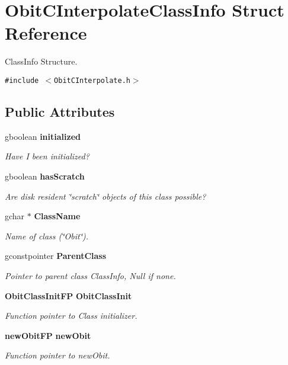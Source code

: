 \section{Obit\-CInterpolate\-Class\-Info Struct Reference}
\label{structObitCInterpolateClassInfo}
Class\-Info Structure.  


{\tt \#include $<$Obit\-CInterpolate.h$>$}

\subsection*{Public Attributes}
\begin{CompactItemize}
\item 
gboolean {\bf initialized}
\begin{CompactList}\small\item\em Have I been initialized? \item\end{CompactList}\item 
gboolean {\bf has\-Scratch}
\begin{CompactList}\small\item\em Are disk resident \char`\"{}scratch\char`\"{} objects of this class possible? \item\end{CompactList}\item 
gchar $\ast$ {\bf Class\-Name}
\begin{CompactList}\small\item\em Name of class (\char`\"{}Obit\char`\"{}). \item\end{CompactList}\item 
gconstpointer {\bf Parent\-Class}
\begin{CompactList}\small\item\em Pointer to parent class Class\-Info, Null if none. \item\end{CompactList}\item 
{\bf Obit\-Class\-Init\-FP} {\bf Obit\-Class\-Init}
\begin{CompactList}\small\item\em Function pointer to Class initializer. \item\end{CompactList}\item 
{\bf new\-Obit\-FP} {\bf new\-Obit}
\begin{CompactList}\small\item\em Function pointer to new\-Obit. \item\end{CompactList}\item 

\end{CompactItemize}
